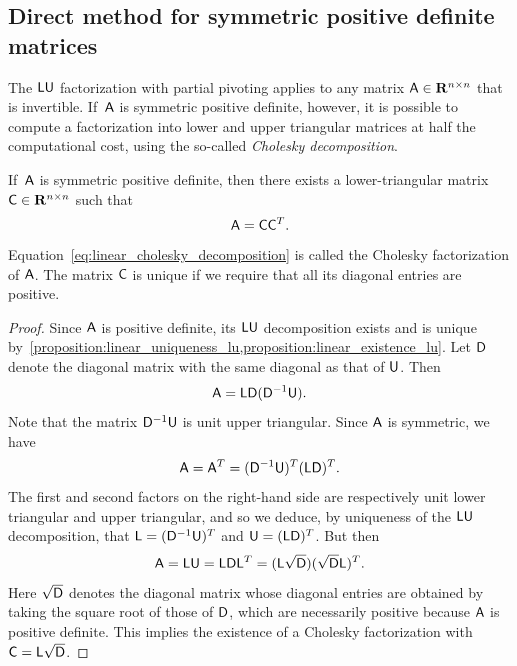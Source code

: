 \subsection{Direct method for symmetric positive definite matrices}%
\label{sub:direct_method_for_symmetric_positive_definite_matrices}
The $\mathsf L \mathsf U$ factorization with partial pivoting applies to any matrix $\mathsf A \in \mathbf R^{n \times n}$ that is invertible.
If~$\mathsf A$ is symmetric positive definite,
however, it is possible to compute a factorization into lower and upper triangular matrices at half the computational cost,
using the so-called \emph{Cholesky decomposition}.
\begin{lemma}
    If~$\mathsf A$ is symmetric positive definite,
    then there exists a lower-triangular matrix $\mathsf C \in \mathbf R^{n \times n}$ such that
    \begin{equation}
        \label{eq:linear_cholesky_decomposition}
        \mathsf A = \mathsf C \mathsf C^T.
    \end{equation}
    Equation~\eqref{eq:linear_cholesky_decomposition} is called the Cholesky factorization of $\mathsf A$.
    The matrix $\mathsf C$ is unique if we require that all its diagonal entries are positive.
\end{lemma}
\begin{proof}
    Since $\mathsf A$ is positive definite,
    its $\mathsf L \mathsf U$ decomposition exists and is unique by~\cref{proposition:linear_uniqueness_lu,proposition:linear_existence_lu}.
    Let $\mathsf D$ denote the diagonal matrix with the same diagonal as that of $\mathsf U$.
    Then
    \[
        \mathsf A = \mathsf L \mathsf D \mathsf (\mathsf D^{-1} \mathsf U).
    \]
    Note that the matrix $\mathsf D^{-1} \mathsf U$ is unit upper triangular.
    Since $\mathsf A$ is symmetric,
    we have
    \[
        \mathsf A = \mathsf A^T = (\mathsf D^{-1} \mathsf U)^T (\mathsf L \mathsf D)^T.
    \]
    The first and second factors on the right-hand side are respectively unit lower triangular and upper triangular,
    and so we deduce, by uniqueness of the $\mathsf L \mathsf U$ decomposition,
    that $\mathsf L = (\mathsf D^{-1} \mathsf U)^T$ and $\mathsf U = (\mathsf L \mathsf D)^T$.
    But then
    \[
        \mathsf A = \mathsf L \mathsf U = \mathsf L \mathsf D \mathsf L^T = (\mathsf L \sqrt{\mathsf D}) (\sqrt{\mathsf D} \mathsf L)^T.
    \]
    Here $\sqrt{\mathsf D}$ denotes the diagonal matrix whose diagonal entries are obtained by taking the square root of those of $\mathsf D$,
    which are necessarily positive because $\mathsf A$ is positive definite.
    This implies the existence of a Cholesky factorization with $\mathsf C = \mathsf L \sqrt{\mathsf D}$.
\end{proof}

